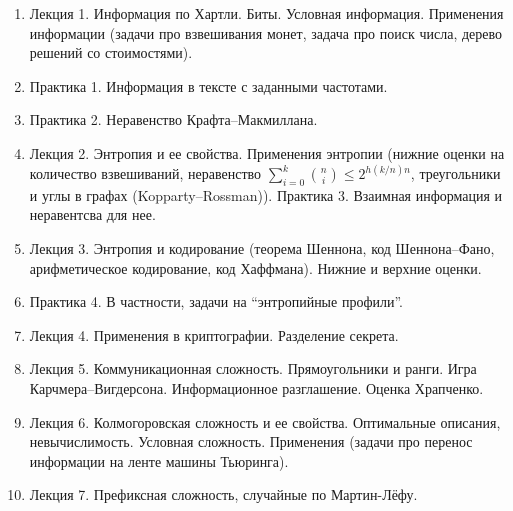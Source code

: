\begin{enumerate}
    \item Лекция 1. Информация по Хартли. Биты. Условная информация.
        Применения информации (задачи про взвешивания монет, задача про поиск числа, дерево решений со
        стоимостями).
    \item Практика 1. Информация в тексте с заданными частотами.
    \item Практика 2. Неравенство Крафта--Макмиллана.
    \item Лекция 2. Энтропия и ее свойства. Применения энтропии (нижние оценки на количество взвешиваний,
        неравенство $\sum\limits_{i = 0}^{k} \binom{n}{i} \le 2^{h(k / n) n}$, треугольники и углы в
        графах (Kopparty--Rossman)).
        Практика 3. Взаимная информация и неравентсва для нее.
    \item Лекция 3. Энтропия и кодирование (теорема Шеннона, код Шеннона--Фано, арифметическое
        кодирование, код Хаффмана). Нижние и верхние оценки.
    \item Практика 4. В частности, задачи на ``энтропийные профили''.
    \item Лекция 4. Применения в криптографии. Разделение секрета.
    \item Лекция 5. Коммуникационная сложность. Прямоугольники и ранги. Игра
        Карчмера--Вигдерсона. Информационное разглашение. Оценка Храпченко.
    \item Лекция 6. Колмогоровская сложность и ее свойства. Оптимальные описания,
        невычислимость. Условная сложность. Применения (задачи про перенос информации на ленте машины Тьюринга).
    \item Лекция 7. Префиксная сложность, случайные по Мартин-Лёфу.
\end{enumerate}